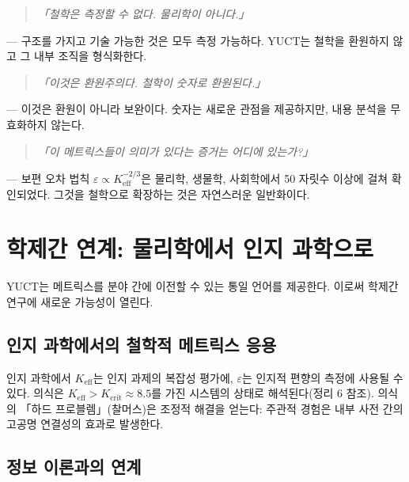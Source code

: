 \documentclass[11pt,a4paper]{article}
\newcommand{\eps}{\varepsilon}
\begin{document}
	\begin{quote}
		\textit{「철학은 측정할 수 없다. 물리학이 아니다.」}
	\end{quote}
	— 구조를 가지고 기술 가능한 것은 모두 측정 가능하다. YUCT는 철학을 환원하지 않고 그 내부 조직을 형식화한다.
	
	\begin{quote}
		\textit{「이것은 환원주의다. 철학이 숫자로 환원된다.」}
	\end{quote}
	— 이것은 환원이 아니라 보완이다. 숫자는 새로운 관점을 제공하지만, 내용 분석을 무효화하지 않는다.
	
	\begin{quote}
		\textit{「이 메트릭스들이 의미가 있다는 증거는 어디에 있는가?」}
	\end{quote}
	— 보편 오차 법칙 \(\eps \propto K_{\mathrm{eff}}^{-2/3}\)은 물리학, 생물학, 사회학에서 50 자릿수 이상에 걸쳐 확인되었다. 그것을 철학으로 확장하는 것은 자연스러운 일반화이다.
	
	\section{학제간 연계: 물리학에서 인지 과학으로}
	\label{sec:interdisciplinary}
	
	YUCT는 메트릭스를 분야 간에 이전할 수 있는 통일 언어를 제공한다. 이로써 학제간 연구에 새로운 가능성이 열린다.
	
	\subsection{인지 과학에서의 철학적 메트릭스 응용}
	
	인지 과학에서 \(K_{\mathrm{eff}}\)는 인지 과제의 복잡성 평가에, \(\eps\)는 인지적 편향의 측정에 사용될 수 있다. 의식은 \(K_{\mathrm{eff}} > K_{\mathrm{crit}} \approx 8.5\)를 가진 시스템의 상태로 해석된다(정리 6 참조). 의식의 「하드 프로블렘」(찰머스)은 조정적 해결을 얻는다: 주관적 경험은 내부 사전 간의 고공명 연결성의 효과로 발생한다.
	
	\subsection{정보 이론과의 연계}
	
\end{document}
